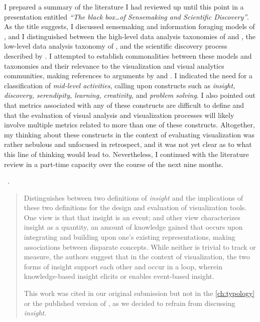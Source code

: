 I prepared a summary of the literature I had reviewed up until this point in a presentation entitled {\it ``The black box\ldots of Sensemaking and Scientific Discovery''}.
As the title suggests, I discussed sensemaking and information foraging models of \citet{Pirolli2009}, and I distinguished between the high-level data analysis taxonomies of \citet{Amar2004} and \citet{Springmeyer1992}, the low-level data analysis taxonomy of \citet{Winckler2004}, and the scientific discovery process described by \citet{Klahr1999}.
I attempted to establish commonalities between these models and taxonomies and their relevance to the visualization and visual analytics communities, making references to arguments by \citet{Thomas2005} and \citet{vanWijk2006}.
I indicated the need for a classification of {\it mid-level activities}, calling upon constructs such as {\it insight, discovery, serendipity, learning, creativity}, and {\it problem solving}.
I also pointed out that metrics associated with any of these constructs are difficult to define and that the evaluation of visual analysis and visualization processes will likely involve multiple metrics related to more than one of these constructs.
Altogether, my thinking about these constructs in the context of evaluating visualization was rather nebulous and unfocused in retrospect, and it was not yet clear as to what this line of thinking would lead to.
Nevertheless, I continued with the literature review in a part-time capacity over the course of the next nine months.

\begin{sloppypar}
~\cite{Chang2009}. \end{sloppypar}

\begin{quotation}
    Distinguishes between two definitions of {\it insight} and the implications of these two definitions for the design and evaluation of visualization tools. 
    One view is that that insight is an event; and other view characterizes insight as a quantity, an amount of knowledge gained that occurs upon integrating and building upon one's existing representations, making associations between disparate concepts. 
    While neither is trivial to track or measure, the authors suggest that in the context of visualization, the two forms of insight support each other and occur in a loop, wherein knowledge-based insight elicits or enables event-based insight. 
    
    This work was cited in our original submission but not in the \autoref{ch:typology} or the published version of \citet{Brehmer2013}, as we decided to refrain from discussing {\it insight}.
\end{quotation}

